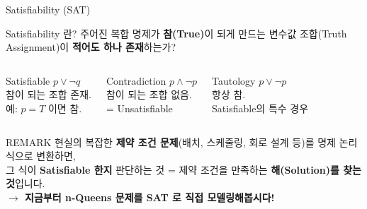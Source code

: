 \documentclass[10.5pt,compress]{beamer}
\begin{document}
\begin{frame}[t]{Satisfiability (SAT)}
    \footnotesize
    \begin{block}{Satisfiability 란?}
        주어진 복합 명제가 \textbf{참(True)}이 되게 만드는 변수값 조합(Truth Assignment)이
        \textbf{적어도 하나 존재}하는가?
    \end{block}

    \vspace{0.08cm}
    \begin{columns}[T]
        \begin{exampleblock}{Satisfiable}
            \scriptsize $p \lor \neg q$\\[3pt]
            참이 되는 조합 존재.\\
            예: $p{=}T$ 이면 참.
        \end{exampleblock}
        \begin{alertblock}{Contradiction}
            \scriptsize $p \land \neg p$\\[3pt]
            참이 되는 조합 없음.\\
            = Unsatisfiable
        \end{alertblock}
        \begin{block}{Tautology}
            \scriptsize $p \lor \neg p$\\[3pt]
            항상 참.\\
            Satisfiable의 특수 경우
        \end{block}
    \end{columns}

    \vspace{0.15cm}
    \begin{exampleblock}{REMARK}
        \scriptsize
        현실의 복잡한 \textbf{제약 조건 문제}(배치, 스케줄링, 회로 설계 등)를
        명제 논리식으로 변환하면,\\
        그 식이 \textbf{Satisfiable 한지} 판단하는 것 = 제약 조건을 만족하는 \textbf{해(Solution)를 찾는 것}입니다.\\[3pt]
        \textbf{$\rightarrow$ 지금부터 n-Queens 문제를 SAT 로 직접 모델링해봅시다!}
    \end{exampleblock}
\end{frame}
\end{document}
